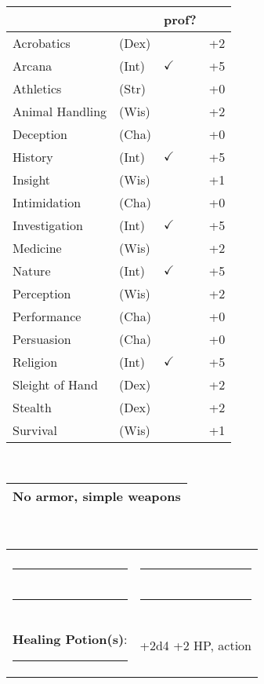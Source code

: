 \documentclass[twocolumn]{article}
\begin{document}
\\
\noindent\begin{tabular}{llll}
 & & prof? & \\
\hline
Acrobatics & (Dex) &  &+2 \\
Arcana & (Int) & $\checkmark$ & +5 \\ 
Athletics & (Str) &  & +0\\
Animal Handling & (Wis) &  & +2\\
Deception & (Cha) &  & +0\\
History & (Int) & $\checkmark$ & +5 \\
Insight & (Wis) &  & +1 \\
Intimidation & (Cha) &  & +0 \\
Investigation & (Int) & $\checkmark$ & +5 \\
Medicine & (Wis) &  & +2 \\
Nature & (Int) & $\checkmark$ & +5 \\
Perception & (Wis) &  & +2 \\
Performance & (Cha) &  & +0 \\
Persuasion & (Cha) &  & +0 \\
Religion & (Int) & $\checkmark$ & +5 \\
Sleight of Hand & (Dex) &  & +2 \\
Stealth & (Dex) &  & +2 \\
Survival & (Wis) &  & +1 \\
\hline
\end{tabular}
\vspace{12pt}

\\
\noindent\begin{tabular}{|m{3.1in}|}
\hline
No armor, simple weapons \\
\hline
\end{tabular}
\vspace{12pt}


\\
\noindent\begin{tabular}{|ll|}
\hline&\\
\rule{1.4in}{.2pt}&\rule{1.4in}{.2pt}\\
\rule{1.4in}{.2pt}&\rule{1.4in}{.2pt}\\
\textbf{Healing Potion(s)}: \rule{.2in}{.2pt}& +2d4 +2 HP, {\sc action}\\
\hline
\end{tabular}
\vspace{12pt}
\end{document}
